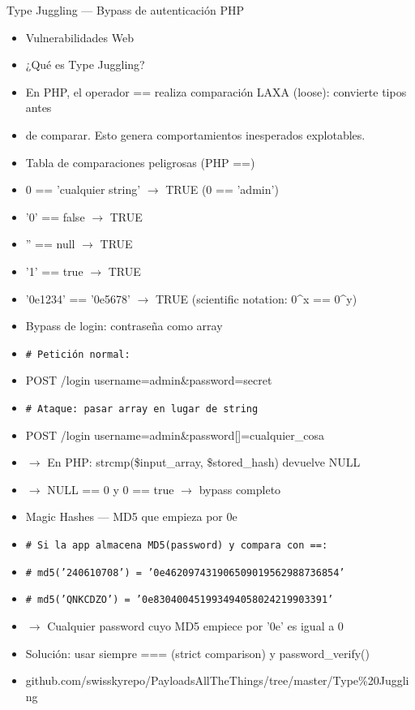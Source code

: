 \documentclass[aspectratio=169,10pt]{beamer}
\newcommand{\cmd}[1]{\texttt{\color{uznavy}#1}}
\begin{document}
\begin{frame}[allowframebreaks]{Type Juggling --- Bypass de autenticación PHP}
\small
  \begin{itemize}
  \item Vulnerabilidades Web
  \item ¿Qué es Type Juggling?
  \item En PHP, el operador == realiza comparación LAXA (loose): convierte tipos antes
  \item de comparar. Esto genera comportamientos inesperados explotables.
  \item Tabla de comparaciones peligrosas (PHP ==)
  \item 0 == 'cualquier string' $\rightarrow$ TRUE (0 == 'admin')
  \item '0' == false $\rightarrow$ TRUE
  \item '' == null $\rightarrow$ TRUE
  \item '1' == true $\rightarrow$ TRUE
  \item '0e1234' == '0e5678' $\rightarrow$ TRUE (scientific notation: 0\textasciicircum{}x == 0\textasciicircum{}y)
  \item Bypass de login: contraseña como array
  \item \cmd{\# Petición normal:}
  \item POST /login username=admin\&password=secret
  \item \cmd{\# Ataque: pasar array en lugar de string}
  \item POST /login username=admin\&password[]=cualquier\_cosa
  \item $\rightarrow$ En PHP: strcmp(\$input\_array, \$stored\_hash) devuelve NULL
  \item $\rightarrow$ NULL == 0 y 0 == true $\rightarrow$ bypass completo
  \item Magic Hashes --- MD5 que empieza por 0e
  \item \cmd{\# Si la app almacena MD5(password) y compara con ==:}
  \item \cmd{\# md5('240610708') = '0e462097431906509019562988736854'}
  \item \cmd{\# md5('QNKCDZO') = '0e830400451993494058024219903391'}
  \item $\rightarrow$ Cualquier password cuyo MD5 empiece por '0e' es igual a 0
  \item Solución: usar siempre === (strict comparison) y password\_verify()
  \item github.com/swisskyrepo/PayloadsAllTheThings/tree/master/Type\%20Juggling
  \end{itemize}
\end{frame}
\end{document}
